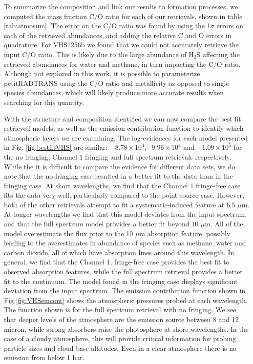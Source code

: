 To summarize the composition and link our results to formation processes, we computed the mass fraction C/O ratio for each of our retrievals, shown in table \ref{tab:atmosum}. 
The error on the C/O ratio was found by using the 1$\sigma$ errors on each of the retrieved abundances, and adding the relative C and O errors in quadrature.
For VHS1256b we found that we could not accurately retrieve the input C/O ratio. 
This is likely due to the large abundance of H$_{2}$S affecting the retrieved abundances for water and methane, in turn impacting the C/O ratio.
Although not explored in this work, it is possible to parameterize petitRADTRANS using the C/O ratio and metallicity as opposed to single species abundances, which will likely produce more accurate results when searching for this quantity.

With the structure and composition identified we can now compare the best fit retrieved models, as well as the emission contribution function to identify which atmospheric layers we are examining.
The log-evidences for each model presented in Fig. \ref{fig:bestfitVHS} are similar: $-8.78\times10^{4}$,$-9.96\times10^{4}$ and  $-1.09\times10^{5}$ for the no fringing, Channel 1 fringing and full spectrum retrievals respectively.
While the it is difficult to compare the evidence for different data sets, we do note that the no fringing case resulted in a better fit to the data than in the fringing case. 
At short wavelengths, we find that the Channel 1 fringe-free case fits the data very well, particularly compared to the point source case.
However, both of the other retrievals attempt to fit a systematic-induced feature at 6.5 $\mu$m.
At longer wavelengths we find that this model deviates from the input spectrum, and that the full spectrum model provides a better fit beyond 10 $\mu$m.
All of the model overestimate the flux prior to the 10 $\mu$m absorption feature, possibly leading to the overestimates in abundance of species such as methane, water and carbon dioxide, all of which have absorption lines around this wavelength.
In general, we find that the Channel 1, fringe-free case provides the best fit to observed absorption features, while the full spectrum retrieval provides a better fit to the continuum. 
The model found in the fringing case displays significant deviation from the input spectrum.
The emission contribution function shown in Fig \ref{fig:VHSemcont} shows the atmospheric pressures probed at each wavelength. 
The function shown is for the full spectrum retrieval with no fringing.
We see that deeper levels of the atmosphere are the emission source between 8 and 12 micron, while strong absorbers raise the photosphere at shore wavelengths.
In the case of a cloudy atmosphere, this will provide critical information for probing particle sizes and cloud base altitudes.
Even in a clear atmosphere there is no emission from below 1 bar.

